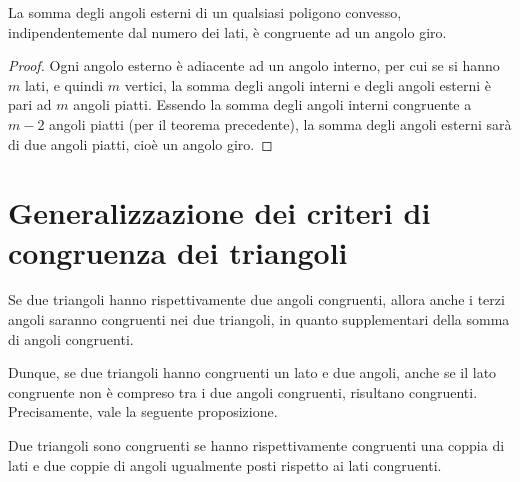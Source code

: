 \begin{teorema}
  La somma degli angoli esterni di un qualsiasi poligono convesso, 
  indipendentemente dal numero dei lati, è congruente ad un angolo giro.
\end{teorema}
\noindent \begin{minipage}{0.5\textwidth}
  \begin{proof}
    Ogni angolo esterno è adiacente ad un angolo interno, per cui se si 
    hanno $m$ lati, e quindi $m$ vertici, la somma degli angoli interni e 
    degli angoli esterni è pari ad $m$ angoli piatti. Essendo la somma 
    degli angoli interni congruente a $m-2$ angoli piatti (per il teorema 
    precedente), la somma degli angoli esterni sarà di due angoli piatti, 
    cioè un angolo giro.
  \end{proof}
\end{minipage}\hfil
\begin{minipage}{0.5\textwidth}
  \centering
\end{minipage}


\section{Generalizzazione dei criteri di congruenza dei 
  triangoli}\label{sect:generalizzazione_criteri_congruenza_triangoli}

Se due triangoli hanno rispettivamente due angoli congruenti, allora 
anche i terzi angoli saranno congruenti nei due triangoli, in quanto 
supplementari della somma di angoli congruenti.

Dunque, se due triangoli hanno congruenti un lato e due angoli, anche 
se il lato congruente non è compreso tra i due angoli congruenti, 
risultano congruenti. Precisamente, vale la seguente proposizione.

\begin{teorema}
  Due triangoli sono congruenti se hanno rispettivamente congruenti una 
  coppia di lati e due coppie di angoli ugualmente posti rispetto ai 
  lati congruenti.
\end{teorema}

